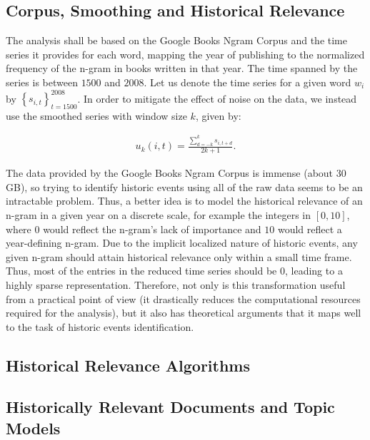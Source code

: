 
\subsection{Corpus, Smoothing and Historical Relevance}

The analysis shall be based on the Google Books Ngram Corpus and the time series it provides for each word, mapping the year of publishing to the normalized frequency of the n-gram in books written in that year. The time spanned by the series is between $1500$ and $2008$. Let us denote the time series for a given word $w_i$ by $\left\{ s_{i, t} \right\}_{t = 1500}^{2008}$. In order to mitigate the effect of noise on the data, we instead use the smoothed series with window size $k$, given by:

\begin{align}
\label{eq:smooth-series}
u_{k} \left( i, t \right) = \frac{\sum_{d = -k}^{k} s_{i, t + d}}{2k + 1}.
\end{align}

The data provided by the Google Books Ngram Corpus is immense (about 30 GB), so trying to identify historic events using all of the raw data seems to be an intractable problem. Thus, a better idea is to model the historical relevance of an n-gram in a given year on a discrete scale, for example the integers in $\left[ 0, 10 \right]$, where $0$ would reflect the n-gram's lack of importance and $10$ would reflect a year-defining n-gram. Due to the implicit localized nature of historic events, any given n-gram should attain historical relevance only within a small time frame. Thus, most of the entries in the reduced time series should be $0$, leading to a highly sparse representation. Therefore, not only is this transformation useful from a practical point of view (it drastically reduces the computational resources required for the analysis), but it also has theoretical arguments that it maps well to the task of historic events identification.

\subsection{Historical Relevance Algorithms}
\label{sec:historical-relevance-algorithms}


\subsection{Historically Relevant Documents and Topic Models}

